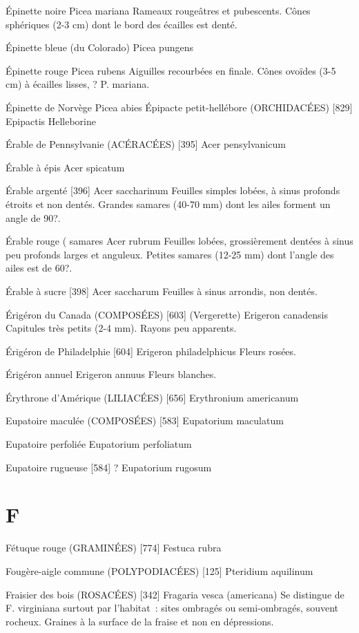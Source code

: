 Épinette noire
				Picea mariana
Rameaux rougeâtres et pubescents.
Cônes sphériques (2-3 cm) dont le bord des écailles est denté.

Épinette bleue (du Colorado)
				Picea pungens

Épinette rouge
				Picea rubens
Aiguilles recourbées en finale.
Cônes ovoïdes (3-5 cm) à écailles lisses, ? P. mariana.

Épinette de Norvège
				Picea abies
Épipacte petit-hellébore (ORCHIDACÉES)  [829]
				Epipactis Helleborine

Érable de Pennsylvanie (ACÉRACÉES)  [395]
				Acer pensylvanicum

Érable à épis
				Acer spicatum

Érable argenté  [396]
				Acer saccharinum
Feuilles simples lobées, à sinus profonds étroits et non dentés.
Grandes samares (40-70 mm) dont les ailes forment un angle de 90?.

Érable rouge							( samares
				Acer rubrum
Feuilles lobées, grossièrement dentées à sinus peu profonds larges et anguleux.
Petites samares (12-25 mm) dont l’angle des ailes est de 60?.

Érable à sucre  [398]
				Acer saccharum
Feuilles à sinus arrondis, non dentés.


Érigéron du Canada (COMPOSÉES)  [603] (Vergerette)
				Erigeron canadensis
Capitules très petits (2-4 mm). Rayons peu apparents.

Érigéron de Philadelphie  [604]
				Erigeron philadelphicus
Fleurs rosées.

Érigéron annuel
				Erigeron annuus
Fleurs blanches.

Érythrone d’Amérique (LILIACÉES)  [656]
				Erythronium americanum

Eupatoire maculée (COMPOSÉES)  [583]
				Eupatorium maculatum

Eupatoire perfoliée
				Eupatorium perfoliatum

Eupatoire rugueuse  [584]							?
				Eupatorium rugosum

\chapter*{F}

Fétuque rouge (GRAMINÉES)  [774]
				Festuca rubra

Fougère-aigle commune (POLYPODIACÉES) [125]
				Pteridium aquilinum

Fraisier des bois (ROSACÉES)  [342]
				Fragaria vesca (americana)
Se distingue de F. virginiana surtout par l’habitat : sites ombragés ou semi-ombragés, souvent rocheux. Graines à la surface de la fraise et non en dépressions.


